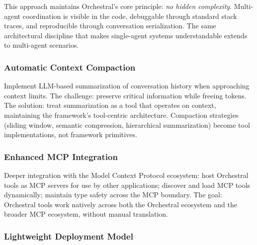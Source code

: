 \documentclass{article}
\begin{document}
This approach maintains Orchestral's core principle: \textit{no hidden complexity}. Multi-agent coordination is visible in the code, debuggable through standard stack traces, and reproducible through conversation serialization. The same architectural discipline that makes single-agent systems understandable extends to multi-agent scenarios.

\subsubsection{Automatic Context Compaction}

Implement LLM-based summarization of conversation history when approaching context limits. The challenge: preserve critical information while freeing tokens. The solution: treat summarization as a tool that operates on context, maintaining the framework's tool-centric architecture. Compaction strategies (sliding window, semantic compression, hierarchical summarization) become tool implementations, not framework primitives.



\subsubsection{Enhanced MCP Integration}

Deeper integration with the Model Context Protocol ecosystem: host Orchestral tools as MCP servers for use by other applications; discover and load MCP tools dynamically; maintain type safety across the MCP boundary. The goal: Orchestral tools work natively across both the Orchestral ecosystem and the broader MCP ecosystem, without manual translation.

\subsubsection{Lightweight Deployment Model}
\end{document}
